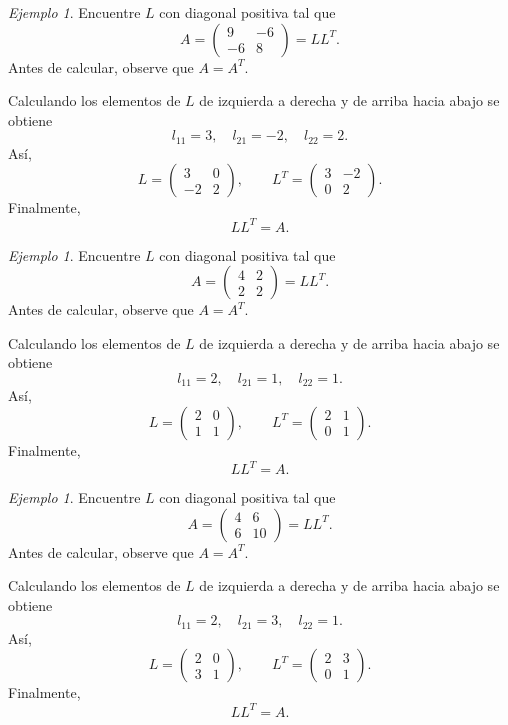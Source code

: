 \documentclass[12pt]{article}
\theoremstyle{remark}
\newtheorem{Ejem}[definicion]{Ejemplo}
\begin{document}
\begin{Ejem}

Encuentre $L$ con diagonal positiva tal que
\[
A=\begin{pmatrix}9 & -6\\-6 & 8\end{pmatrix}=LL^T.
\]
Antes de calcular, observe que $A=A^T$.

Calculando los elementos de $L$ de izquierda a derecha y de arriba hacia abajo se obtiene
\[
l_{11}=3,\quad l_{21}=-2,\quad l_{22}=2.
\]
Así,
\[
L=\begin{pmatrix}3 & 0\\-2 & 2\end{pmatrix},\qquad L^T=\begin{pmatrix}3 & -2\\0 & 2\end{pmatrix}.
\]
Finalmente,
\[
\boxed{LL^T=A}.
\]

\end{Ejem}

\begin{Ejem}

Encuentre $L$ con diagonal positiva tal que
\[
A=\begin{pmatrix}4 & 2\\2 & 2\end{pmatrix}=LL^T.
\]
Antes de calcular, observe que $A=A^T$.

Calculando los elementos de $L$ de izquierda a derecha y de arriba hacia abajo se obtiene
\[
l_{11}=2,\quad l_{21}=1,\quad l_{22}=1.
\]
Así,
\[
L=\begin{pmatrix}2 & 0\\1 & 1\end{pmatrix},\qquad L^T=\begin{pmatrix}2 & 1\\0 & 1\end{pmatrix}.
\]
Finalmente,
\[
\boxed{LL^T=A}.
\]

\end{Ejem}

\begin{Ejem}

Encuentre $L$ con diagonal positiva tal que
\[
A=\begin{pmatrix}4 & 6\\6 & 10\end{pmatrix}=LL^T.
\]
Antes de calcular, observe que $A=A^T$.

Calculando los elementos de $L$ de izquierda a derecha y de arriba hacia abajo se obtiene
\[
l_{11}=2,\quad l_{21}=3,\quad l_{22}=1.
\]
Así,
\[
L=\begin{pmatrix}2 & 0\\3 & 1\end{pmatrix},\qquad L^T=\begin{pmatrix}2 & 3\\0 & 1\end{pmatrix}.
\]
Finalmente,
\[
\boxed{LL^T=A}.
\]
\end{Ejem}
\end{document}
